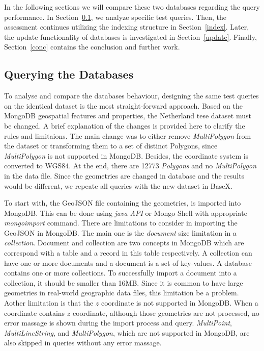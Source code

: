 \documentclass[a4paper,12pt]{article}
\begin{document}
In the following sections we will compare these two databases regarding the query performance. 
In Section~\ref{query}, we analyze specific test queries. Then, the assessment continues
utilizing the indexing structure in Section~\ref{index}. Later, the update functionality of databases is 
investigated in Section~\ref{update}. Finally, Section~\ref{conc} contains the conclusion and further work.

\subsection{Querying the Databases}
\label{query}
To analyse and compare the databases behaviour, designing the same test queries on the identical dataset is the most straight-forward approach. Based on the MongoDB geospatial features and properties, the Netherland tese dataset must be changed. A brief explanation of the changes is provided here to clarify the rules and limitaions. The main change was to either remove \textit{MultiPolygon} from the dataset or transforming them to a set of distinct Polygons, since \textit{MultiPolygon} is not supported in MongoDB. Besides, the coordinate system is converted to WGS84. At the end, there are 12773 \textit{Polygons} and no \textit{MultiPolygon} in the data file. Since the geometries are changed in database and the results would be different, we repeate all queries with the new dataset in BaseX.  

To start with, the GeoJSON file containing the geometries, is imported into MongoDB. This can be done  using \textit{java API} or Mongo Shell with appropriate \textit{mongoimport} command. There are limitations to consider in importing the GeoJSON in MongoDB. The main one is the \textit{document} size limitation in a \textit{collection}. Document and collection are two concepts in MongoDB which are correspond with a table and a record in this table respectively. A collection can have one or more documents and a document is a set of key-values. A database contains one or more collections. To successfully import a document into a collection, it should be smaller than 16MB. Since it is common to have large geometries in real-world geographic data files, this limitation be a problem. Aother limitation is that the $z$ coordinate is not supported in MongoDB. When a coordinate contains $z$ coordinate, although those geometries are not processed, no error massage is shown during the import process and query. \textit{MultiPoint}, \textit{MultiLineString}, and \textit{MultiPolygon}, which are not supported in MongoDB, are also skipped in queries without any error massage. 
\end{document}
